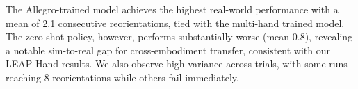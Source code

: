 \begin{table}[h]
\centering
\caption{Real-world in-hand cube reorientation on the Allegro Hand over 10 independent trials. Entries report the number of consecutive successful reorientations before failure.}
\label{tab:allegro_real_world}
\vspace{-2mm}
\end{table}



The Allegro-trained model achieves the highest real-world performance with a mean of 2.1 consecutive reorientations, tied with the multi-hand trained model. The zero-shot policy, however, performs substantially worse (mean 0.8), revealing a notable sim-to-real gap for cross-embodiment transfer, consistent with our LEAP Hand results. We also observe high variance across trials, with some runs reaching 8 reorientations while others fail immediately.